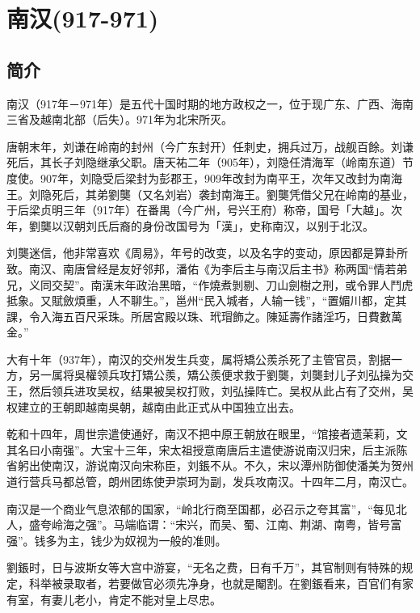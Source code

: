 

\section{南汉\tiny(917-971)}

\subsection{简介}

南汉（917年－971年）是五代十国时期的地方政权之一，位于现广东、广西、海南三省及越南北部（后失）。971年为北宋所灭。

唐朝末年，刘谦在岭南的封州（今广东封开）任刺史，拥兵过万，战舰百餘。刘谦死后，其长子刘隐继承父职。唐天祐二年（905年），刘隐任清海军（岭南东道）节度使。907年，刘隐受后梁封为彭郡王，909年改封为南平王，次年又改封为南海王。刘隐死后，其弟劉龑（又名刘岩）袭封南海王。劉龑凭借父兄在岭南的基业，于后梁贞明三年（917年）在番禺（今广州，号兴王府）称帝，国号「大越」。次年，劉龑以汉朝刘氏后裔的身份改国号为「漢」，史称南汉，以别于北汉。

刘龑迷信，他非常喜欢《周易》，年号的改变，以及名字的变动，原因都是算卦所致。南汉、南唐曾经是友好邻邦，潘佑《为李后主与南汉后主书》称两国“情若弟兄，义同交契”。南漢末年政治黑暗，“作燒煮剝剔、刀山劍樹之刑，或令罪人鬥虎抵象。又賦斂煩重，人不聊生。”，邕州“民入城者，人输一钱”，“置媚川都，定其課，令入海五百尺采珠。所居宮殿以珠、玳瑁飾之。陳延壽作諸淫巧，日費數萬金。”

大有十年（937年），南汉的交州发生兵变，属将矯公羨杀死了主管官员，割据一方，另一属将吳權领兵攻打矯公羨，矯公羨便求救于劉龑，刘龑封儿子刘弘操为交王，然后领兵进攻吴权，结果被吴权打败，刘弘操阵亡。吴权从此占有了交州，吴权建立的王朝即越南吳朝，越南由此正式从中国独立出去。

乾和十四年，周世宗遣使通好，南汉不把中原王朝放在眼里，“馆接者遗茉莉，文其名曰小南强”。大宝十三年，宋太祖授意南唐后主遣使游说南汉归宋，后主派陈省躬出使南汉，游说南汉向宋称臣，刘鋹不从。不久，宋以潭州防御使潘美为贺州道行营兵马都总管，朗州团练使尹崇珂为副，发兵攻南汉。十四年二月，南汉亡。

南汉是一个商业气息浓郁的国家，“岭北行商至国都，必召示之夸其富”，“每见北人，盛夸岭海之强”。马端临谓：“宋兴，而吴、蜀、江南、荆湖、南粤，皆号富强”。钱多为主，钱少为奴视为一般的准则。

劉鋹时，日与波斯女等大宫中游宴，“无名之费，日有千万”，其官制则有特殊的规定，科举被录取者，若要做官必须先净身，也就是閹割。在劉鋹看来，百官们有家有室，有妻儿老小，肯定不能对皇上尽忠。









